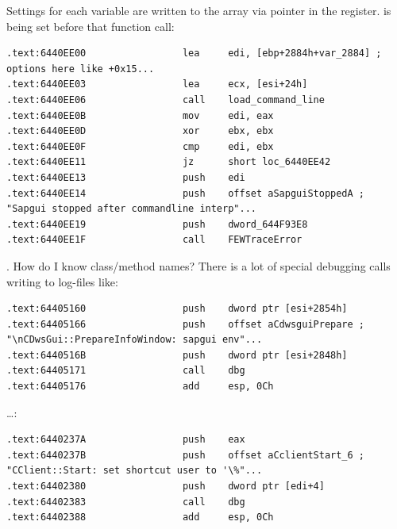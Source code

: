 {Settings for each variable are written to the array via pointer in the \EDI register. \EDI is being set before that function call}:

\begin{lstlisting}
.text:6440EE00                 lea     edi, [ebp+2884h+var_2884] ; options here like +0x15...
.text:6440EE03                 lea     ecx, [esi+24h]
.text:6440EE06                 call    load_command_line
.text:6440EE0B                 mov     edi, eax
.text:6440EE0D                 xor     ebx, ebx
.text:6440EE0F                 cmp     edi, ebx
.text:6440EE11                 jz      short loc_6440EE42
.text:6440EE13                 push    edi
.text:6440EE14                 push    offset aSapguiStoppedA ; "Sapgui stopped after commandline interp"...
.text:6440EE19                 push    dword_644F93E8
.text:6440EE1F                 call    FEWTraceError
\end{lstlisting}

 .
{How do I know class/method names? There is a lot of special debugging calls writing to log-files like}:

\begin{lstlisting}
.text:64405160                 push    dword ptr [esi+2854h]
.text:64405166                 push    offset aCdwsguiPrepare ; "\nCDwsGui::PrepareInfoWindow: sapgui env"...
.text:6440516B                 push    dword ptr [esi+2848h]
.text:64405171                 call    dbg
.text:64405176                 add     esp, 0Ch
\end{lstlisting}

\dots \OrENRU:

\begin{lstlisting}
.text:6440237A                 push    eax
.text:6440237B                 push    offset aCclientStart_6 ; "CClient::Start: set shortcut user to '\%"...
.text:64402380                 push    dword ptr [edi+4]
.text:64402383                 call    dbg
.text:64402388                 add     esp, 0Ch
\end{lstlisting}

